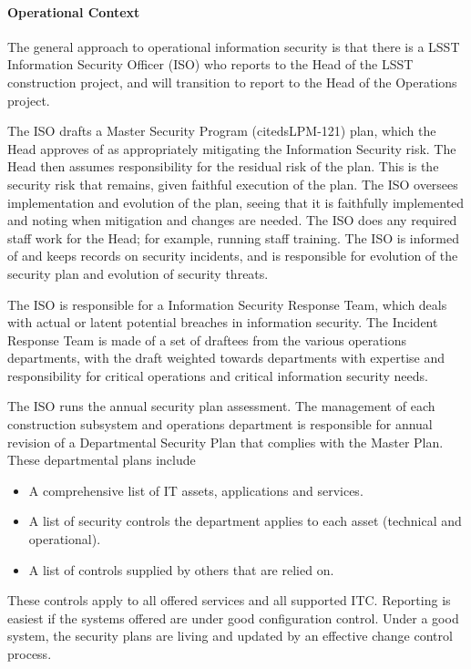 \paragraph{Operational Context}

The general approach to operational information security is that there is a LSST 
Information Security Officer (ISO) who reports to the Head of the LSST 
construction project, and will transition to report to the Head of the Operations 
project.  

The ISO drafts a Master Security Program (citeds{LPM-121}) plan, which the Head 
approves of as appropriately mitigating the Information Security risk. The Head 
then assumes responsibility for the residual risk of the plan. This is the 
security risk that remains, given faithful execution of the plan. The ISO 
oversees implementation and evolution of the plan, seeing that it is faithfully 
implemented and noting when mitigation and changes are needed. The ISO does any 
required staff work for the Head; for example, running staff training. The ISO 
is informed of and keeps records on security incidents, and is responsible for 
evolution of the security plan and evolution of security threats.  

The ISO is responsible for a Information Security Response Team, which deals 
with actual or latent potential breaches in information security. The Incident 
Response Team is made of a set of draftees from the various operations 
departments, with the draft weighted towards departments with expertise and 
responsibility for critical operations and critical information security needs.

 The ISO runs the annual security plan assessment. The management of each 
 construction subsystem and operations department is responsible for annual 
 revision of a Departmental Security Plan that complies with the Master Plan. 
 These departmental plans include 
 
\begin{itemize}
\item A comprehensive list of IT assets, applications and services.
\item A list of security controls the department applies to each asset 
(technical and operational).
\item A list of controls supplied by others that are relied on. 
\end{itemize}

These controls apply to all offered services and all supported ITC. Reporting 
is easiest if the systems offered are under good configuration control. Under a 
good system, the security plans are living and updated by an effective change 
control process.  

